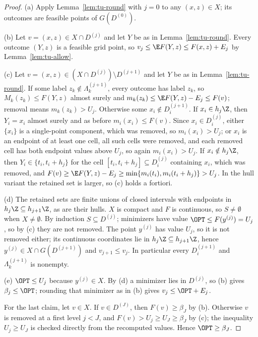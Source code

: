 \begin{proof}
(a) Apply Lemma~\ref{lem:tu-round} with $j=0$ to any $(x,z)\in X$; its
outcomes are feasible points of $G(D^{(0)})$.

(b) Let $v=(x,z)\in X\cap D^{(j)}$ and let $Y$ be as in
Lemma~\ref{lem:tu-round}. Every outcome $(Y,z)$ is a feasible grid point, so
$v_j\le\E F(Y,z)\le F(x,z)+E_j$ by Lemma~\ref{lem:tu-allow}.

(c) Let $v=(x,z)\in(X\cap D^{(j)})\setminus D^{(j+1)}$ and let $Y$ be as in
Lemma~\ref{lem:tu-round}. If some label $z_k\notin\Lambda^{(j+1)}_k$, every
outcome has label $z_k$, so $M_k(z_k)\le F(Y,z)$ almost surely and
$m_k(z_k)\le\E F(Y,z)-E_j\le F(v)$; removal means $m_k(z_k)>U_j$. Otherwise
some $x_i\notin D^{(j+1)}_i$. If $x_i\in h_j\Z$, then $Y_i=x_i$ almost surely
and as before $m_i(x_i)\le F(v)$. Since $x_i\in D^{(j)}_i$, either $\{x_i\}$ is a
single-point component, which was removed, so $m_i(x_i)>U_j$; or $x_i$ is an
endpoint of at least one cell, all such cells were removed, and each removed
cell has both endpoint values above $U_j$, so again $m_i(x_i)>U_j$. If
$x_i\notin h_j\Z$, then $Y_i\in\{t_i,t_i+h_j\}$ for the cell
$[t_i,t_i+h_j]\subseteq D^{(j)}_i$ containing $x_i$, which was removed, and
$F(v)\ge\E F(Y,z)-E_j\ge\min\{m_i(t_i),m_i(t_i+h_j)\}>U_j$. In the hull variant
the retained set is larger, so (c) holds a fortiori.

(d) The retained sets are finite unions of closed intervals with endpoints in
$h_j\Z\subseteq h_{j+1}\Z$, as are their hulls. $X$ is compact and $F$ is
continuous, so $S\ne\emptyset$ when $X\ne\emptyset$. By induction
$S\subseteq D^{(j)}$; minimizers have value $\OPT\le F(y^{(j)})=U_j$, so by
(c) they are not removed. The point $y^{(j)}$ has value $U_j$, so it is not
removed either; its continuous coordinates lie in $h_j\Z\subseteq h_{j+1}\Z$,
hence $y^{(j)}\in X\cap G(D^{(j+1)})$ and $v_{j+1}\le v_j$. In particular
every $D^{(j+1)}_i$ and $\Lambda^{(j+1)}_k$ is nonempty.

(e) $\OPT\le U_j$ because $y^{(j)}\in X$. By (d) a minimizer lies in
$D^{(j)}$, so (b) gives $\beta_j\le\OPT$; rounding that minimizer as in (b)
gives $v_j\le\OPT+E_j$.

For the last claim, let $v\in X$. If $v\in D^{(J)}$, then $F(v)\ge\beta_J$ by
(b). Otherwise $v$ is removed at a first level $j<J$, and
$F(v)>U_j\ge U_J\ge\beta_J$ by (c); the inequality $U_j\ge U_J$ is checked
directly from the recomputed values. Hence $\OPT\ge\beta_J$.
\end{proof}

